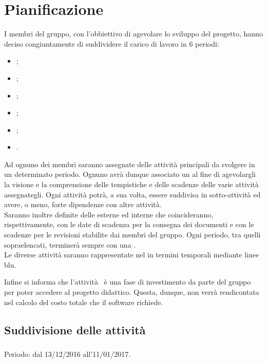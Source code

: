 \newpage
\section{Pianificazione}
I membri del gruppo, con l'obbiettivo di agevolare lo sviluppo del progetto, hanno deciso congiuntamente di suddividere il carico di lavoro in 6 periodi:
\begin{itemize}
	\item \ARM;
	\item \ARD;
	\item \PA;
	\item \PD;
	\item \COD;
	\item \VV.
\end{itemize}

Ad ognuno dei membri saranno assegnate delle attività principali da svolgere in un determinato periodo. Ognuno avrà dunque associato un  al fine di agevolargli la visione e la comprensione delle tempistiche e delle scadenze delle varie attività assegnategli.
Ogni attività potrà, a sua volta, essere suddivisa in sotto-attività ed avere, o meno, forte dipendenze con altre attività.\\
Saranno inoltre definite delle  esterne ed interne che coincideranno, rispettivamente, con le date di scadenza per la consegna dei documenti e con le scadenze per le revisioni stabilite dai membri del gruppo.
Ogni periodo, tra quelli sopraelencati, terminerà sempre con una .\\

Le diverse attività saranno rappresentate nel  in termini temporali mediante linee blu.

Infine si informa che l'attività \ARM\ è una fase di investimento da parte del gruppo per poter accedere al progetto didattico. Questa, dunque, non verrà rendicontata nel calcolo del costo totale che il software richiede.

\subsection{Suddivisione delle attività}

\subsubsection{\ARM}
Periodo: dal 13/12/2016 all'11/01/2017. \\


